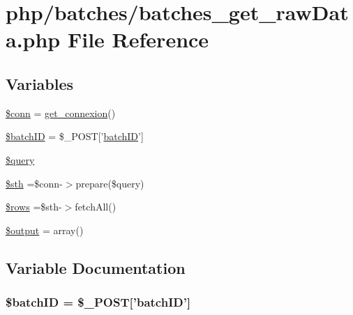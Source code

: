 \hypertarget{batches__get__raw_data_8php}{\section{php/batches/batches\-\_\-get\-\_\-raw\-Data.php File Reference}
\label{batches__get__raw_data_8php}
}
\subsection*{Variables}
\begin{DoxyCompactItemize}
\item 
\hyperlink{batches__get__raw_data_8php_aa8a5a87b9c1a6a0819b88447cbe41877}{\$conn} = \hyperlink{php__functions_8php_ace18bc10f3fd08f92688ac743e0d8c2e}{get\-\_\-connexion}()
\item 
\hyperlink{batches__get__raw_data_8php_aaa6d122ea9cb55b210aadd86e5654a74}{\$batch\-I\-D} = \$\-\_\-\-P\-O\-S\-T\mbox{[}'\hyperlink{obsolete_2processing__bak_8php_a88c5bc4262b7c34f236357f5c53fc99b}{batch\-I\-D}'\mbox{]}
\item 
\hyperlink{batches__get__raw_data_8php_af59a5f7cd609e592c41dc3643efd3c98}{\$query}
\item 
\hyperlink{batches__get__raw_data_8php_afa9126f9664959c02795be300a135f93}{\$sth} =\$conn-\/$>$prepare(\$query)
\item 
\hyperlink{batches__get__raw_data_8php_ace2ec39e7df3899fa8df9640ec274b03}{\$rows} =\$sth-\/$>$fetch\-All()
\item 
\hyperlink{batches__get__raw_data_8php_a73004ce9cd673c1bfafd1dc351134797}{\$output} = array()
\end{DoxyCompactItemize}


\subsection{Variable Documentation}
\hypertarget{batches__get__raw_data_8php_aaa6d122ea9cb55b210aadd86e5654a74}{
\subsubsection[{\$batch\-I\-D}]{\setlength{\rightskip}{0pt plus 5cm}\${\bf batch\-I\-D} = \$\-\_\-\-P\-O\-S\-T\mbox{[}'{\bf batch\-I\-D}'\mbox{]}}}\label{batches__get__raw_data_8php_aaa6d122ea9cb55b210aadd86e5654a74}


